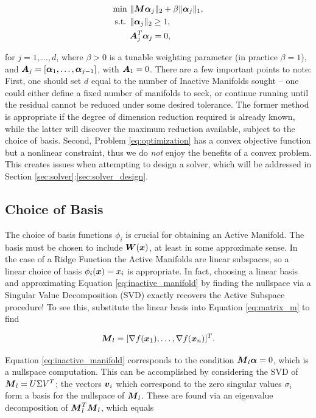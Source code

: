 \documentclass[]{aiaa-tc}%
\begin{document}
\begin{equation}
\begin{aligned}
\label{eq:optimization}
\text{min  }& \|\boldsymbol{M}\boldsymbol{\alpha}_j\|_2 + \beta\|\boldsymbol{\alpha}_j\|_1, \\
\text{s.t. }& \|\boldsymbol{\alpha}_j\|_2\geq1, \\
            & \boldsymbol{A}_j^T \boldsymbol{\alpha}_j = 0,
\end{aligned}
\end{equation}

for $j=1,\dots,d$, where $\beta>0$ is a tunable weighting parameter (in practice $\beta=1$), and $\boldsymbol{A}_j=[\boldsymbol{\alpha}_1,\dots,\boldsymbol{\alpha}_{j-1}]$, with $\boldsymbol{A}_1=0$. There are a few important points to note: First, one should set $d$ equal to the number of Inactive Manifolds sought -- one could either define a fixed number of manifolds to seek, or continue running until the residual cannot be reduced under some desired tolerance. The former method is appropriate if the degree of dimension reduction required is already known, while the latter will discover the maximum reduction available, subject to the choice of basis. Second, Problem \ref{eq:optimization} has a convex objective function but a nonlinear constraint, thus we do \emph{not} enjoy the benefits of a convex problem. This creates issues when attempting to design a solver, which will be addressed in Section \ref{sec:solver}:\ref{sec:solver_design}.

\subsection{Choice of Basis} \label{sec:basis}
The choice of basis functions $\phi_i$ is crucial for obtaining an Active Manifold. The basis must be chosen to include $\boldsymbol{W}(\boldsymbol{x})$, at least in some approximate sense. In the case of a Ridge Function the Active Manifolds are linear subspaces, so a linear choice of basis $\phi_i(\boldsymbol{x}) = x_i$ is appropriate. In fact, choosing a linear basis and approximating Equation \ref{eq:inactive_manifold} by finding the nullspace via a Singular Value Decomposition (SVD) exactly recovers the Active Subspace procedure! To see this, substitute the linear basis into Equation \ref{eq:matrix_m} to find

\begin{equation}
\label{eq:matrix_m_linear}
\boldsymbol{M}_l = [\nabla f(\boldsymbol{x}_1),\dots,\nabla f(\boldsymbol{x}_n)]^T.
\end{equation}

Equation \ref{eq:inactive_manifold} corresponds to the condition $\boldsymbol{M}_l\boldsymbol{\alpha}=0$, which is a nullspace computation. This can be accomplished by considering the SVD of $\boldsymbol{M}_l=U\Sigma V^T$; the vectors $\boldsymbol{v}_i$ which correspond to the zero singular values $\sigma_i$ form a basis for the nullspace of $\boldsymbol{M}_l$. These are found via an eigenvalue decomposition of $\boldsymbol{M}_l^T\boldsymbol{M}_l$, which equals
\end{document}
